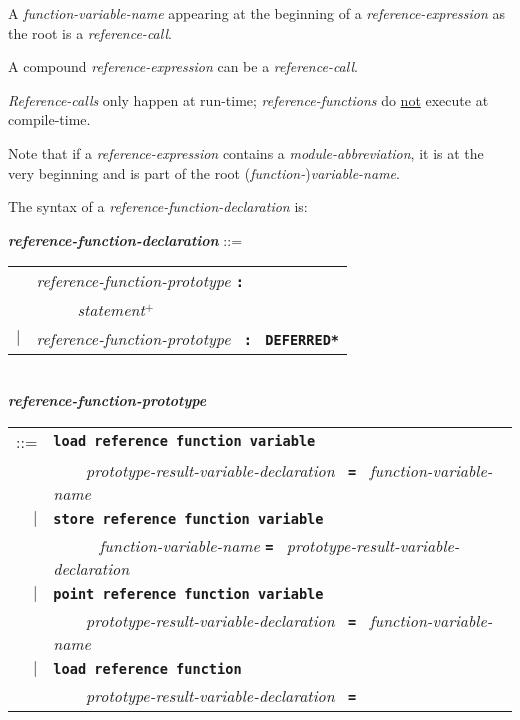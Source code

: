 \documentclass[12pt]{article}
\newcommand{\TT}[1]{{\tt \bfseries #1}}
\newcommand{\PLUS}[1][]{{$^{+#1}$}}
\newcommand{\ttkey}[1]{{\tt \bfseries #1}}
\newcommand{\emkey}[1]{{\em \bfseries #1}}
\newenvironment{indpar}[1][0.3in]%
	{\begin{list}{}%
		     {\setlength{\itemsep}{0in}%
		      \setlength{\topsep}{0in}%
		      \setlength{\parsep}{1ex}%
		      \setlength{\labelwidth}{#1}%
		      \setlength{\leftmargin}{#1}%
		      \addtolength{\leftmargin}{\labelsep}}%
	 \item}%
	{\end{list}}
\begin{document}
A {\em function-variable-name} appearing at the beginning of
a {\em reference-expression} as the root is a {\em reference-call}.

A compound {\em reference-expression} can be a {\em reference-call}.

{\em Reference-calls} only happen at run-time; {\em reference-functions}
do \underline{not} execute at compile-time.

Note that if a {\em reference-expression} contains a
{\em module-abbreviation}, it is at the very beginning and
is part of the root ({\em function-}){\em variable-name}.

The syntax of a {\em reference-function-declaration} is:

\begin{indpar}[0.1in]
\emkey{reference-function-declaration}\label{REFERENCE-FUNCTION-DECLARATION}
	::= \\
\hspace*{2em}
    \begin{tabular}[t]{rl}
        &  {\em reference-function-prototype} \TT{:} \\
	& \TT{~~~~~}{\em statement}\PLUS{} \\
    $|$ &  {\em reference-function-prototype}~ \TT{:}~ \ttkey{*DEFERRED*} \\
    \end{tabular}
\\[2ex]
\emkey{reference-function-prototype}\label{REFERENCE-FUNCTION-PROTOTYPE} \\
\hspace*{0.25in}
    \begin{tabular}[t]{rl}
        ::= & \ttkey{load reference function variable} \\
	    & \TT{~~~~}{\em prototype-result-variable-declaration}~ \TT{=}~
            	{\em function-variable-name} \\
        $|$ & \ttkey{store reference function variable} \\
	    & \TT{~~~~}~ {\em function-variable-name} \TT{=}~
            	{\em prototype-result-variable-declaration} \\
        $|$ & \ttkey{point reference function variable} \\
	    & \TT{~~~~}{\em prototype-result-variable-declaration}~ \TT{=}~
            	{\em function-variable-name} \\
        $|$ & \ttkey{load reference function} \\
	    & \TT{~~~~}{\em prototype-result-variable-declaration}~ \TT{=}~

\end{tabular}
\end{indpar}
\end{document}
